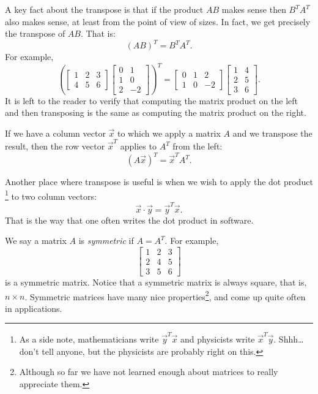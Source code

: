 \documentclass{ximera}
\begin{document}
A key fact about the transpose is that if the product $AB$ makes sense then $B^TA^T$ also makes sense, at least from the point of view of sizes. In fact, we get precisely the transpose of $AB$.  That is:
\begin{equation*}
    {(AB)}^T = B^TA^T .
\end{equation*}
For example,
\begin{equation*}
    {\left(
    \begin{bmatrix}
        1 & 2 & 3 \\
        4 & 5 & 6
    \end{bmatrix}
    \begin{bmatrix}
        0 & 1 \\
        1 & 0 \\
        2 & -2
    \end{bmatrix}
    \right)}^T =
    \begin{bmatrix}
        0 & 1 & 2 \\
        1 & 0 & -2
    \end{bmatrix}
    \begin{bmatrix}
        1 & 4 \\
        2 & 5 \\
        3 & 6 
    \end{bmatrix} .
\end{equation*}
It is left to the reader to verify that computing the matrix product on the left and then transposing is the same as computing the matrix product on the right.

If we have a column vector $\vec{x}$ to which we apply a matrix $A$ and we transpose the result, then the row vector $\vec{x}^T$ applies to $A^T$ from the left:
\begin{equation*}
    {(A\vec{x})}^T = \vec{x}^TA^T .
\end{equation*}

Another place where transpose is useful is when we wish to apply the dot product%
\footnote{As a side note, mathematicians write $\vec{y}^T\vec{x}$ and physicists write $\vec{x}^T\vec{y}$.  Shhh\ldots don't tell anyone, but the physicists are probably right on this.}
to two column vectors:
\begin{equation*}
    \vec{x} \cdot \vec{y} = \vec{y}^T \vec{x} .
\end{equation*}
That is the way that one often writes the dot product in software.

We say a matrix $A$ is \emph{symmetric} if $A = A^T$.  For example,
\begin{equation*}
    \begin{bmatrix}
        1 & 2 & 3 \\
        2 & 4 & 5 \\
        3 & 5 & 6
    \end{bmatrix}
\end{equation*}
is a symmetric matrix.  Notice that a symmetric matrix is always square, that is, $n \times n$. Symmetric matrices have many nice properties\footnote{Although so far we have not learned enough about matrices to really appreciate them.}, and come up quite often in applications.
\end{document}

